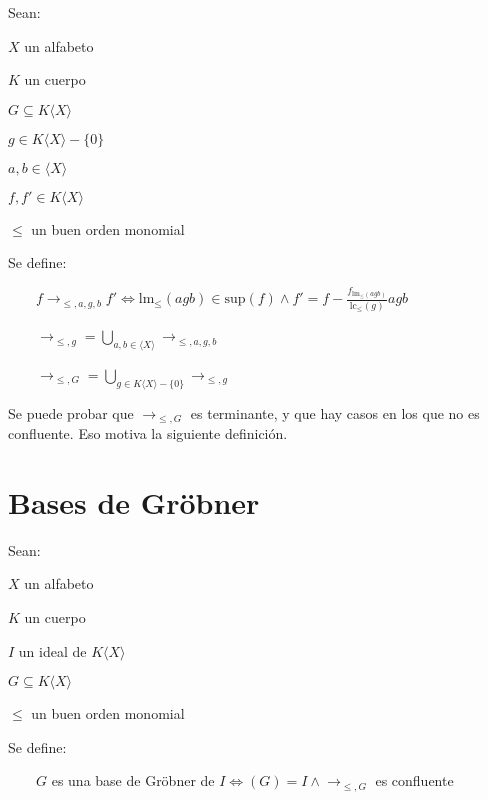 \documentclass{amsbook}
\begin{document}
Sean:

$X$ un alfabeto

$K$ un cuerpo

$G ⊆ K⟨X⟩$

$g ∈ K⟨X⟩ - \{0\}$

$a, b ∈ ⟨X⟩$

$f, f' ∈ K⟨X⟩$

$≤$ un buen orden monomial

Se define:

    $f →_{≤, a, g, b} f' ⇔ \text{lm}_≤(agb) ∈ \text{sup}(f) ∧ f' = f - \frac{f_{\text{lm}_≤(agb)}}{\text{lc}_≤(g)}agb$

    $→_{≤, g} = \bigcup_{a, b ∈ ⟨X⟩} →_{≤, a, g, b}$

    $→_{≤, G} = \bigcup_{g ∈ K⟨X⟩ - \{0\}} →_{≤, g}$

Se puede probar que $→_{≤, G}$ es terminante, y que hay casos en los que no es confluente. Eso motiva la siguiente definición.

\section{Bases de Gröbner}

Sean:

$X$ un alfabeto

$K$ un cuerpo

$I$ un ideal de $K⟨X⟩$

$G ⊆ K⟨X⟩$

$≤$ un buen orden monomial

Se define:

    $G$ es una base de Gröbner de $I ⇔ (G) = I ∧ →_{≤, G}$ es confluente
\end{document}
